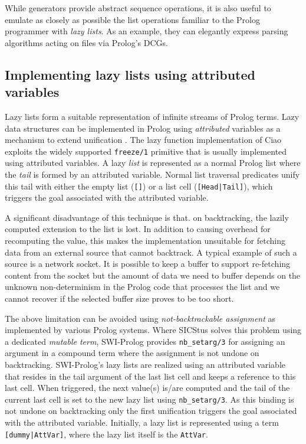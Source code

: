 \documentclass{new_tlp}
\begin{document}
While generators provide abstract sequence operations, it is also useful
to emulate as closely as possible the  list operations familiar to the 
Prolog programmer with {\em lazy lists}. 
As an example, they can elegantly express parsing algorithms acting on files 
via Prolog's DCGs.

\subsection{Implementing lazy lists using attributed variables}

Lazy lists form a suitable representation of infinite streams of Prolog
terms. Lazy data structures can be implemented in Prolog using
\emph{attributed} variables as a mechanism to extend unification
\cite{holz92}. 
The lazy function implementation of
Ciao \cite{lazyCiao,casas2005functional}
exploits the widely supported
\texttt{freeze/1} primitive that is usually implemented using attributed
variables. A lazy \emph{list} is represented as a normal Prolog list where the
\emph{tail} is formed by an attributed variable. Normal list traversal
predicates unify this tail with either the empty list (\texttt{[]}) or a
list cell (\texttt{[Head|Tail]}), which triggers the goal associated
with the attributed variable.

A significant disadvantage of this technique is that. on backtracking, the
lazily computed extension to the list is lost. In addition to causing
overhead for recomputing the value, this makes the implementation
unsuitable for fetching data from an external source that cannot
backtrack. A typical example of such a source is a network socket. It is
possible to keep a buffer to support re-fetching content from the socket
but the amount of data we need to buffer depends on the unknown
non-determinism in the Prolog code that processes the list and we cannot
recover if the selected buffer size proves to be too short.

The above limitation can be avoided using \emph{not-backtrackable
assignment} as implemented by various Prolog systems. Where SICStus
solves this problem using a dedicated \emph{mutable term}, SWI-Prolog
provides
\texttt{nb\_setarg/3}
for assigning an argument in a compound term where the assignment is not
undone on backtracking. SWI-Prolog's lazy lists are realized using an
attributed variable that resides in the tail argument of the last list
cell and keeps a reference to this last cell. When triggered, the next
value(s) is/are computed and the tail of the current last cell is set to
the new lazy list using \texttt{nb\_setarg/3}. As this binding is not
undone on backtracking only the first unification triggers the goal
associated with the attributed variable. Initially, a lazy list is
represented using a term \texttt{[dummy|AttVar]}, where the lazy list
itself is the  \texttt{AttVar}.
\end{document}
